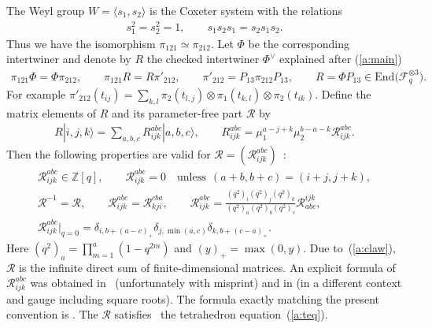 \documentclass[pdftex]{sigma}
\begin{document}
The Weyl group $W=\langle s_1, s_2 \rangle$ is the Coxeter system
with the relations
\begin{gather*}
s_1^2=s_2^2=1,\qquad
s_1s_2s_1 = s_2s_1s_2.
\end{gather*}
Thus we have the isomorphism
$\pi_{121} \simeq \pi_{212}$.
Let $\Phi$ be the corresponding intertwiner and denote by $R$
the checked intertwiner $\Phi^\vee$ explained after (\ref{a:main})
\begin{gather*}
 \pi_{121} \Phi = \Phi  \pi_{212},\qquad
\pi_{121} R = R  \pi'_{212},
\qquad \pi'_{212} = P_{13}\pi_{212}P_{13},\qquad
 R = \Phi P_{13}\in \mathrm{End}\big(\mathcal{F}_q^{\otimes 3}\big).
\end{gather*}
For example
$\pi'_{212}(t_{ij}) = \sum_{k,l}
\pi_2(t_{l,j})\otimes \pi_1(t_{k,l})\otimes \pi_2(t_{ik})$.
Def\/ine the matrix elements of $R$ and its parameter-free part
$\mathscr{R}$ by
\begin{gather*}
R |i,j,k \rangle=
\sum_{a,b,c}R^{abc}_{ijk}|a,b,c \rangle,
\qquad
R^{abc}_{ijk}  = \mu_1^{a-j+k}\mu_2^{b-a-k}
\mathscr{R}^{abc}_{ijk}.
\end{gather*}
Then the following properties are valid for
$\mathscr{R} = (\mathscr{R}^{abc}_{ijk})$~\cite{KO1}:
\begin{gather}
 \mathscr{R}^{abc}_{ijk} \in \mathbb{Z}[q],\qquad
\mathscr{R}^{abc}_{ijk}=0 \quad \mathrm{unless}\ \ (a+b, b+c)=(i+j,j+k),
\label{a:claw}\\
 \mathscr{R}^{-1} = \mathscr{R},
\qquad\mathscr{R}^{abc}_{ijk} = \mathscr{R}^{cba}_{kji},\qquad
{\mathscr{R}}^{abc}_{ijk}
= \frac{(q^2)_i(q^2)_j(q^2)_k}{(q^2)_a(q^2)_b(q^2)_c}
{\mathscr{R}}^{ijk}_{abc},\label{a:rprop}\\
\mathscr{R}^{abc}_{ijk}|_{q=0} = \delta_{i, b+(a-c)_+}\delta_{j,\min(a,c)}
\delta_{k, b+(c-a)_+}.\label{a:r0}
\end{gather}
Here $(q^2)_a = \prod\limits_{m=1}^a(1-q^{2m})$
and $(y)_+ = \max(0,y)$.
Due to~(\ref{a:claw}), $\mathscr{R}$ is the inf\/inite direct sum
of f\/inite-dimensional matrices.
An explicit formula of $\mathscr{R}^{abc}_{ijk}$ was obtained in~\cite{KV} (unfortunately with misprint) and in
\cite[equation~(59)]{BMS} (in a dif\/ferent context and gauge including square roots).
The formula exactly matching the present convention is
\cite[equation~(2.20)]{KO1}.
The $\mathscr{R}$ satisf\/ies~\cite{KV}
the tetrahedron equation~(\ref{a:teq}).
\end{document}
